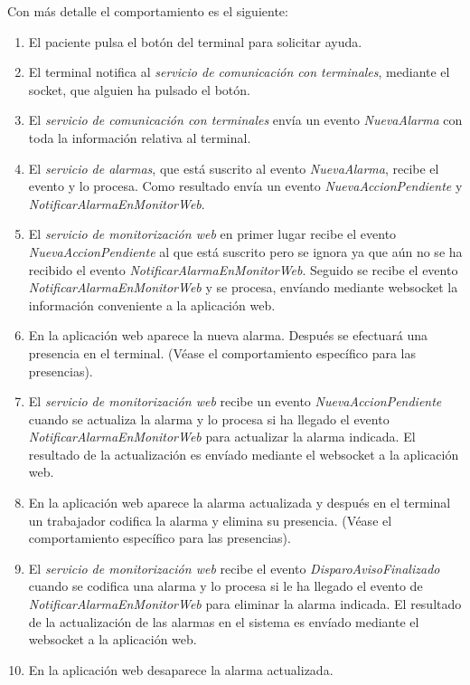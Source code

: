 Con más detalle el comportamiento es el siguiente:
\begin{enumerate}
	\item El paciente pulsa el botón del terminal para solicitar ayuda.	
	\item El terminal notifica al \textit{servicio de comunicación con terminales}, mediante el socket, que alguien ha pulsado el botón.
	\item El \textit{servicio de comunicación con terminales} envía un evento \textit{NuevaAlarma} con toda la información relativa al terminal.
	\item El \textit{servicio de alarmas}, que está suscrito al evento \textit{NuevaAlarma}, recibe el evento y lo procesa. Como resultado envía un evento \textit{NuevaAccionPendiente} y \textit{NotificarAlarmaEnMonitorWeb}.
	\item El \textit{servicio de monitorización web} en primer lugar recibe el evento \textit{NuevaAccionPendiente} al que está suscrito pero se ignora ya que aún no se ha recibido el evento \textit{NotificarAlarmaEnMonitorWeb}. Seguido se recibe el evento \textit{NotificarAlarmaEnMonitorWeb} y se procesa, envíando mediante websocket la información conveniente a la aplicación web.
	\item En la aplicación web aparece la nueva alarma. Después se efectuará una presencia en el terminal. (Véase el comportamiento específico para las presencias).
	\item El \textit{servicio de monitorización web} recibe un evento \textit{NuevaAccionPendiente} cuando se actualiza la alarma y lo procesa si ha llegado el evento \textit{NotificarAlarmaEnMonitorWeb} para actualizar la alarma indicada. El resultado de la actualización es envíado mediante el websocket a la aplicación web.
	\item En la aplicación web aparece la alarma actualizada y después en el terminal un trabajador codifica la alarma y elimina su presencia. (Véase el comportamiento específico para las presencias).
	\item El \textit{servicio de monitorización web} recibe el evento \textit{DisparoAvisoFinalizado} cuando se codifica una alarma y lo procesa si le ha llegado el evento de \textit{NotificarAlarmaEnMonitorWeb} para eliminar la alarma indicada. El resultado de la actualización de las alarmas en el sistema es envíado mediante el websocket a la aplicación web.
	\item En la aplicación web desaparece la alarma actualizada.
\end{enumerate}


